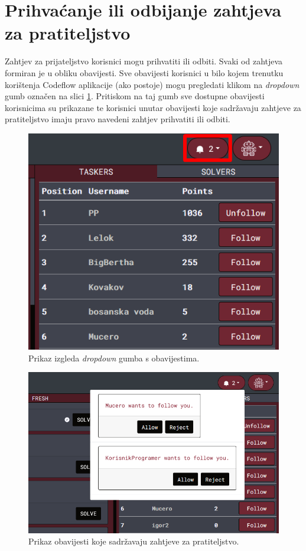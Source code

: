 \documentclass[times, utf8, zavrsni, numeric]{fer}
\begin{document}
		\section{Prihvaćanje ili odbijanje zahtjeva za pratiteljstvo}
		Zahtjev za prijateljstvo korisnici mogu prihvatiti ili odbiti. Svaki od zahtjeva formiran je u obliku obavijesti. Sve obavijesti korisnici u bilo kojem trenutku korištenja Codeflow aplikacije (ako postoje) mogu pregledati klikom na \textit{dropdown} gumb označen na slici \ref{fig:notificationbutton}. Pritiskom na taj gumb sve dostupne obavijesti korisnicima su prikazane te korisnici unutar obavijesti koje sadržavaju zahtjeve za pratiteljstvo imaju pravo navedeni zahtjev prihvatiti ili odbiti.
		\begin{figure}[H]
			\centering
			\includegraphics[scale=0.65]{pictures/koristenje/GumbZaObavijesti.png}
			\caption{Prikaz izgleda \textit{dropdown} gumba s obavijestima.}
			\label{fig:notificationbutton}
		\end{figure}
		\begin{figure}[H]
			\centering
			\includegraphics[scale=0.55]{pictures/koristenje/ZahtjevObavijesti.png}
			\caption{Prikaz obavijesti koje sadržavaju zahtjeve za pratiteljstvo.}
			\label{fig:pratiteljstvo}
		\end{figure}
	
\end{document}
